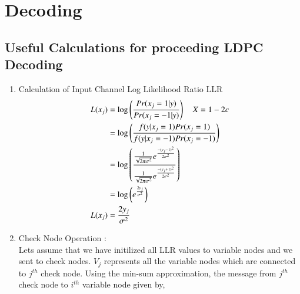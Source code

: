 \documentclass[journal,12pt,twocolumn]{IEEEtran}
\begin{document}
\section{Decoding}
\subsection{Useful Calculations for proceeding LDPC Decoding }
\begin{enumerate}
\item Calculation of Input Channel Log Likelihood Ratio LLR 
\begin{align}
L(x_j)&=\log \left(\frac{Pr(x_j=1|y)}{Pr(x_j=-1|y)}\right) \quad X=1-2c\\
&= \log \left(\frac{f(y|x_j=1)Pr(x_j=1)}{f(y|x_j=-1)Pr(x_j=-1)}\right) \\
&= \log \left(\frac{\frac{1}{\sqrt{2\pi\sigma^2}}e^{\frac{-(y_j-1)^2}{2\sigma^2}}}{\frac{1}{\sqrt{2\pi\sigma^2}}e ^{\frac{-(y_j+1)^2}{2\sigma^2}}} \right) \\
&=\log \left(e^{\frac{2y_j}{\sigma^2}}\right) \\
L(x_j)&= \frac{2y_j}{\sigma^2} \label{eq :li}
\end{align}
\item Check Node Operation : \\
Lets assume that we have initilized all LLR values to variable nodes and we sent to check nodes. ${V_j}$ represents all the variable nodes which are connected to $j^{th}$ check node. Using the min-sum approximation\cite{minsum}, the message from  $j^{th}$ check node to  $i^{th}$ variable node given by,
\begin{figure}[!ht]
\begin{center}
%
%
%
%
%
%
%
%
%
%
%
%
%

\end{center}
\end{figure}
\end{enumerate}
\end{document}
